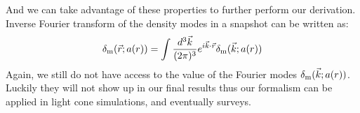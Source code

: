\documentclass[prd,amsmath,amssymb,floatfix,superscriptaddress,nofootinbib,twocolumn]{revtex4-1}
\def\be{\begin{equation}}
\def\ee{\end{equation}}
\def\bea{\begin{eqnarray}}
\def\eea{\end{eqnarray}}
\newcommand{\LC}{\rm LC}
\newcommand{\vrr}{\vec{r}}
\newcommand{\vs}{\nonumber\\}
\newcommand{\vk}{\vec{k}}
\newcommand{\ec}[1]{Eq.~(\ref{eq:#1})}
\newcommand{\eql}[1]{\label{eq:#1}}
\begin{document}
And we can take advantage of these properties to further perform our derivation. Inverse Fourier transform of the density modes in a snapshot can be written as:
\be 
\delta_{\rm m}(\vrr;a(r)) =\int \frac{d^3 \vk}{(2\pi)^3}e^{i\vk\cdot\vrr}\delta_{\rm m}(\vk;a(r))\eql{feq}
\ee 
Again, we still do not have access to the value of the Fourier modes $\delta_{\rm m}(\vk;a(r))$. Luckily they will not show up in our final results thus our formalism can be applied in light cone simulations, and eventually surveys. 
\end{document}
